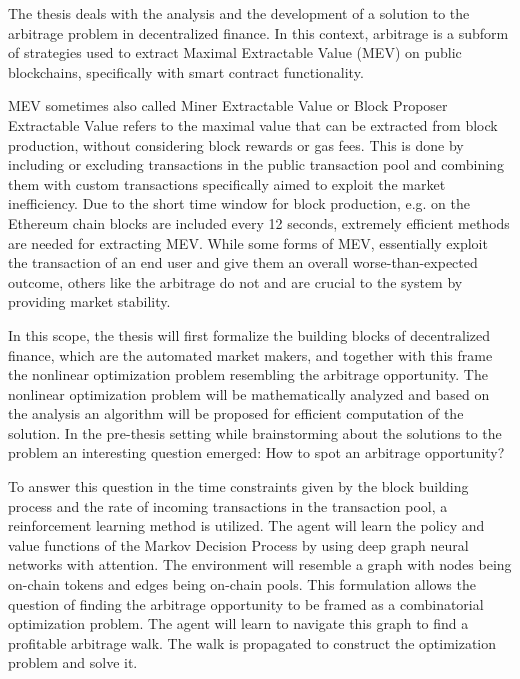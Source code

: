 



\maketitle
\thispagestyle{empty}
\vspace*{\fill}
The thesis deals with the analysis and the development of a solution to the
arbitrage problem in decentralized finance. In this context, arbitrage is a
subform of strategies used to extract Maximal Extractable Value (MEV) on
public blockchains, specifically with smart contract functionality.

MEV sometimes also called Miner Extractable Value or Block Proposer
Extractable Value refers to the maximal value that can be extracted from
block production, without considering block rewards or gas fees. This is done
by including or excluding transactions in the public transaction pool and
combining them with custom transactions specifically aimed to exploit the
market inefficiency. Due to the short time window for block production, e.g.
on the Ethereum chain blocks are included every 12 seconds, extremely
efficient methods are needed for extracting MEV. While some forms of MEV,
essentially exploit the transaction of an end user and give them an overall
worse-than-expected outcome, others like the arbitrage do not and are crucial
to the system by providing market stability.

In this scope, the thesis will first formalize the building blocks of
decentralized finance, which are the automated market makers, and together with
this frame the nonlinear optimization problem resembling the arbitrage opportunity. The
nonlinear optimization problem will be mathematically analyzed and based on the
analysis an algorithm will be proposed for efficient computation of the
solution. In the pre-thesis setting while brainstorming about the solutions to
the problem an interesting question emerged: How to spot an arbitrage
opportunity?

To answer this question in the time constraints given by the block building
process and the rate of incoming transactions in the transaction pool, a
reinforcement learning method is utilized. The agent will learn the policy
and value functions of the Markov Decision Process by using deep graph neural
networks with attention. The environment will resemble a graph with nodes
being on-chain tokens and edges being on-chain pools. This formulation allows
the question of finding the arbitrage opportunity to be framed as a
combinatorial optimization problem. The agent will learn to navigate this
graph to find a profitable arbitrage walk. The walk is propagated to
construct the optimization problem and solve it.
\vspace*{\fill}


